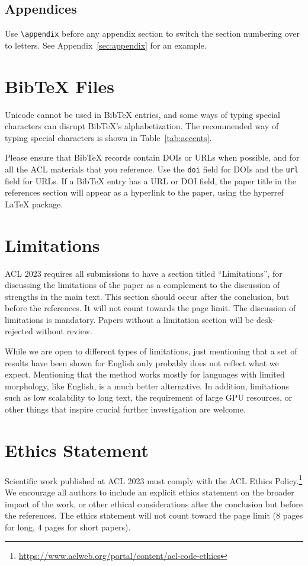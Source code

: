 \documentclass[11pt]{article}
\begin{document}
\subsection{Appendices}

Use \verb|\appendix| before any appendix section to switch the section numbering over to letters. See Appendix~\ref{sec:appendix} for an example.

\section{Bib\TeX{} Files}
\label{sec:bibtex}

Unicode cannot be used in Bib\TeX{} entries, and some ways of typing special characters can disrupt Bib\TeX's alphabetization. The recommended way of typing special characters is shown in Table~\ref{tab:accents}.

Please ensure that Bib\TeX{} records contain DOIs or URLs when possible, and for all the ACL materials that you reference.
Use the \verb|doi| field for DOIs and the \verb|url| field for URLs.
If a Bib\TeX{} entry has a URL or DOI field, the paper title in the references section will appear as a hyperlink to the paper, using the hyperref \LaTeX{} package.

\section*{Limitations}
ACL 2023 requires all submissions to have a section titled ``Limitations'', for discussing the limitations of the paper as a complement to the discussion of strengths in the main text. This section should occur after the conclusion, but before the references. It will not count towards the page limit.
The discussion of limitations is mandatory. Papers without a limitation section will be desk-rejected without review.

While we are open to different types of limitations, just mentioning that a set of results have been shown for English only probably does not reflect what we expect. 
Mentioning that the method works mostly for languages with limited morphology, like English, is a much better alternative.
In addition, limitations such as low scalability to long text, the requirement of large GPU resources, or other things that inspire crucial further investigation are welcome.

\section*{Ethics Statement}
Scientific work published at ACL 2023 must comply with the ACL Ethics Policy.\footnote{\url{https://www.aclweb.org/portal/content/acl-code-ethics}} We encourage all authors to include an explicit ethics statement on the broader impact of the work, or other ethical considerations after the conclusion but before the references. The ethics statement will not count toward the page limit (8 pages for long, 4 pages for short papers).
\end{document}
